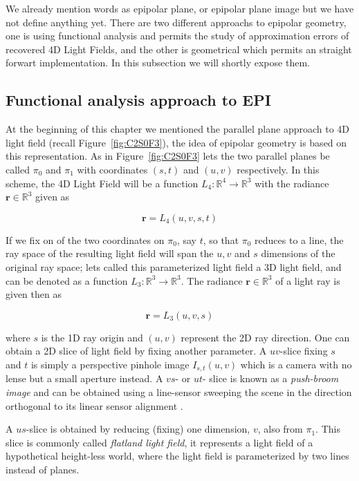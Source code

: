\bigskip

We already mention words as epipolar plane, or epipolar plane image but we have not define anything yet. There are two different approachs to epipolar geometry, one is using functional analysis and permits the study of approximation errors of recovered 4D Light Fields, and the other is geometrical which permits an straight forwart implementation. In this subsection we will shortly expose them. 

\subsection{Functional analysis approach to EPI}

At the beginning of this chapter we mentioned the parallel plane approach to 4D light field (recall Figure~\ref{fig:C2S0F3}), the idea of epipolar geometry is based on this representation. As in Figure~\ref{fig:C2S0F3} lets the two parallel planes be called $\pi_0$ and $\pi_1$ with coordinates $(s,t)$ and $(u,v)$ respectively. In this scheme, the 4D Light Field will be a function $L_4:\mathbb{R}^4\longrightarrow\mathbb{R}^3$ with the radiance $\mathbf{r}\in\mathbb{R}^3$ given as

$$
\mathbf{r}=L_4(u,v,s,t)
$$

If we fix on of the two coordinates on $\pi_0$, say $t$, so that $\pi_0$ reduces to a line, the ray space of the resulting light field will span the $u,v$ and $s$ dimensions of the original ray space; lets called this parameterized light field a 3D light field, and can be denoted as a function $L_3:\mathbb{R}^3\longrightarrow\mathbb{R}^3$. The radiance $\mathbf{r}\in\mathbb{R}^3$ of a light ray is given then as

$$
\mathbf{r}=L_3(u,v,s)
$$

where $s$ is the 1D ray origin and $(u,v)$ represent the 2D ray direction. One can obtain a 2D slice of light field by fixing another parameter. A $uv$-slice fixing $s$ and $t$ is simply a perspective pinhole image $I_{s,t}(u,v)$ which is a camera with no lense but a small aperture instead. A $vs$- or $ut$- slice is known as a \textit{push-broom image} and can be obtained using a line-sensor sweeping the scene in the direction orthogonal to its linear sensor alignment \cite{Gupta}. 


 A $us$-slice is obtained by reducing (fixing) one dimension, $v$, also from $\pi_1$. This slice is commonly called \textit{flatland light field}, it represents a light field of a hypothetical height-less world, where the light field is parameterized by two lines instead of planes.

